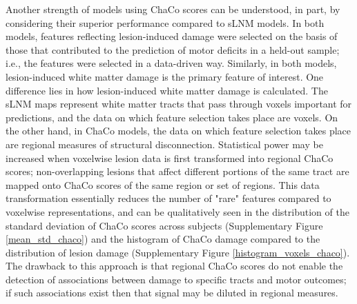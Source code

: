 \documentclass[10pt]{article}
\begin{document}
Another strength of models using ChaCo scores can be understood, in part, by considering their superior performance compared to sLNM models. In both models, features reflecting lesion-induced damage were selected on the basis of those that contributed to the prediction of motor deficits in a held-out sample; i.e., the features were selected in a data-driven way. Similarly, in both models, lesion-induced white matter damage is the primary feature of interest. One difference lies in how lesion-induced white matter damage is calculated. The sLNM maps represent white matter tracts that pass through voxels important for predictions, and the data on which feature selection takes place are voxels. On the other hand, in ChaCo models, the data on which feature selection takes place are regional measures of structural disconnection. Statistical power may be increased when voxelwise lesion data is first transformed into regional ChaCo scores; non-overlapping lesions that affect different portions of the same tract are mapped onto ChaCo scores of the same region or set of regions. This data transformation essentially reduces the number of "rare" features compared to voxelwise representations, and can be qualitatively seen in the distribution of the standard deviation of ChaCo scores across subjects (Supplementary Figure \ref{mean_std_chaco}) and the histogram of ChaCo damage compared to the distribution of lesion damage (Supplementary Figure \ref{histogram_voxels_chaco}). The drawback to this approach is that regional ChaCo scores do not enable the detection of associations between damage to specific tracts and motor outcomes; if such associations exist then that signal may be diluted in regional measures. 
\end{document}
